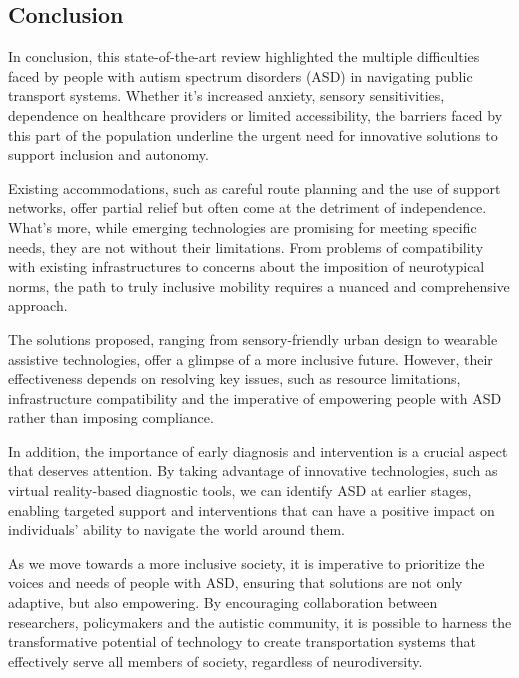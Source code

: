 \subsection{Conclusion}

In conclusion, this state-of-the-art review highlighted the multiple difficulties faced by people with autism spectrum disorders (ASD) in navigating public transport systems. Whether it's increased anxiety, sensory sensitivities, dependence on healthcare providers or limited accessibility, the barriers faced by this part of the population underline the urgent need for innovative solutions to support inclusion and autonomy.

Existing accommodations, such as careful route planning and the use of support networks, offer partial relief but often come at the detriment of independence. What's more, while emerging technologies are promising for meeting specific needs, they are not without their limitations. From problems of compatibility with existing infrastructures to concerns about the imposition of neurotypical norms, the path to truly inclusive mobility requires a nuanced and comprehensive approach.

The solutions proposed, ranging from sensory-friendly urban design to wearable assistive technologies, offer a glimpse of a more inclusive future. However, their effectiveness depends on resolving key issues, such as resource limitations, infrastructure compatibility and the imperative of empowering people with ASD rather than imposing compliance.

In addition, the importance of early diagnosis and intervention is a crucial aspect that deserves attention. By taking advantage of innovative technologies, such as virtual reality-based diagnostic tools, we can identify ASD at earlier stages, enabling targeted support and interventions that can have a positive impact on individuals' ability to navigate the world around them.

As we move towards a more inclusive society, it is imperative to prioritize the voices and needs of people with ASD, ensuring that solutions are not only adaptive, but also empowering. By encouraging collaboration between researchers, policymakers and the autistic community, it is possible to harness the transformative potential of technology to create transportation systems that effectively serve all members of society, regardless of neurodiversity.
\medskip



